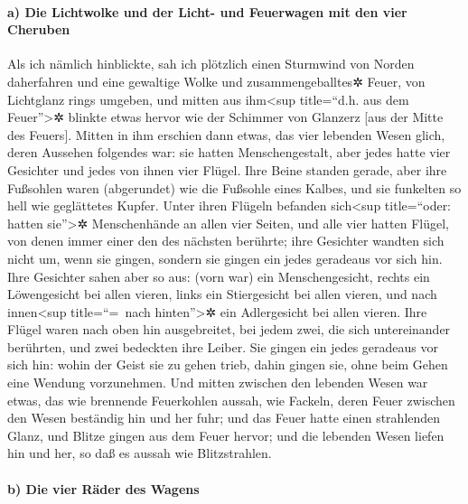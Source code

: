 \hypertarget{a-die-lichtwolke-und-der-licht--und-feuerwagen-mit-den-vier-cheruben}{%
\paragraph{a) Die Lichtwolke und der Licht- und Feuerwagen mit den vier
Cheruben}\label{a-die-lichtwolke-und-der-licht--und-feuerwagen-mit-den-vier-cheruben}}

Als ich nämlich hinblickte, sah ich plötzlich einen
Sturmwind von Norden daherfahren und eine gewaltige Wolke und
zusammengeballtes✲ Feuer, von Lichtglanz rings umgeben, und mitten aus
ihm\textless sup title=``d.h. aus dem Feuer''\textgreater✲ blinkte etwas
hervor wie der Schimmer von Glanzerz {[}aus der Mitte des Feuers{]}.
Mitten in ihm erschien dann etwas, das vier lebenden Wesen
glich, deren Aussehen folgendes war: sie hatten Menschengestalt,
aber jedes hatte vier Gesichter und jedes von ihnen vier
Flügel. Ihre Beine standen gerade, aber ihre Fußsohlen
waren (abgerundet) wie die Fußsohle eines Kalbes, und sie funkelten so
hell wie geglättetes Kupfer. Unter ihren Flügeln befanden
sich\textless sup title=``oder: hatten sie''\textgreater✲ Menschenhände
an allen vier Seiten, und alle vier hatten Flügel, von
denen immer einer den des nächsten berührte; ihre Gesichter wandten sich
nicht um, wenn sie gingen, sondern sie gingen ein jedes geradeaus vor
sich hin. Ihre Gesichter sahen aber so aus: (vorn war)
ein Menschengesicht, rechts ein Löwengesicht bei allen vieren, links ein
Stiergesicht bei allen vieren, und nach innen\textless sup
title=``=~nach hinten''\textgreater✲ ein Adlergesicht bei allen vieren.
Ihre Flügel waren nach oben hin ausgebreitet, bei jedem
zwei, die sich untereinander berührten, und zwei bedeckten ihre Leiber.
Sie gingen ein jedes geradeaus vor sich hin: wohin der
Geist sie zu gehen trieb, dahin gingen sie, ohne beim Gehen eine Wendung
vorzunehmen. Und mitten zwischen den lebenden Wesen war
etwas, das wie brennende Feuerkohlen aussah, wie Fackeln, deren Feuer
zwischen den Wesen beständig hin und her fuhr; und das Feuer hatte einen
strahlenden Glanz, und Blitze gingen aus dem Feuer hervor;
und die lebenden Wesen liefen hin und her, so daß es
aussah wie Blitzstrahlen.

\hypertarget{b-die-vier-ruxe4der-des-wagens}{%
\paragraph{b) Die vier Räder des
Wagens}\label{b-die-vier-ruxe4der-des-wagens}}

